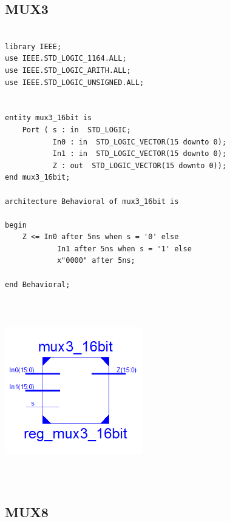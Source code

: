 \documentclass{article}
\begin{document}
\subsection{MUX3}\label{sec:result}

\begin{lstlisting}

library IEEE;
use IEEE.STD_LOGIC_1164.ALL;
use IEEE.STD_LOGIC_ARITH.ALL;
use IEEE.STD_LOGIC_UNSIGNED.ALL;


entity mux3_16bit is
    Port ( s : in  STD_LOGIC;
           In0 : in  STD_LOGIC_VECTOR(15 downto 0);
           In1 : in  STD_LOGIC_VECTOR(15 downto 0);
           Z : out  STD_LOGIC_VECTOR(15 downto 0));
end mux3_16bit;

architecture Behavioral of mux3_16bit is

begin
	Z <= In0 after 5ns when s = '0' else
			In1 after 5ns when s = '1' else
			x"0000" after 5ns;

end Behavioral;
\end{lstlisting}

\includegraphics[width=6cm, height=8cm]{mux3.png}

\pagebreak
\subsection{MUX8}\label{sec:result}
\end{document}
